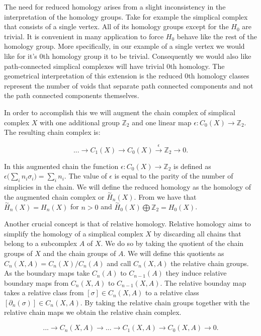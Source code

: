 The need for reduced homology arises from a slight inconsistency in the interpretation of the homology groups. Take for example the simplical complex that consists of a single vertex. All of its homology groups except for the $H_0$ are trivial. It is convenient in many application to force $H_0$ behave like the rest of the homology group. More specifically, in our example of a single vertex we would like for it's 0th homology group it to be trivial. Consequently we would also like path-connected simplical complexes will have trivial 0th homology. The geometrical interpretation of this extension is the reduced 0th homology classes represent the number of voids that separate path connected components and not the path connected components themselves.

In order to accomplish this we will augment the chain complex of simplical complex $X$ with one additional group $\mathbb{Z}_2$ and one linear map $\epsilon : C_0(X) \to \mathbb{Z}_2$. The resulting chain complex is:

$$ ... \longrightarrow C_1(X) \longrightarrow C_0(X) \overset{\epsilon}{\longrightarrow} \mathbb{Z}_2 \longrightarrow 0 .$$

In this augmented chain the function $\epsilon: C_0(X) \to \mathbb{Z}_2$ is defined as $\epsilon\big(\sum_{i}n_i\sigma_i\big) = \sum_{i}n_i$. The value of $\epsilon$ is equal to the parity of the number of simplicies in the chain. We will define the reduced homology as the homology of the augmented chain complex or $\overset{\sim}{H}_n(X)$. From \cite{algebraic-topology} we have that $\overset{\sim}{H}_n(X) = H_n(X)$ for $n > 0$ and $\overset{\sim}{H}_0(X) \bigoplus \mathbb{Z}_2 = H_0(X)$.

Another crucial concept is that of relative homology. Relative homology aims to simplify the homology of a simplical complex $X$ by discarding all chains that belong to a subcomplex $A$ of $X$. We do so by taking the quotient of the chain groups of $X$ and the chain groups of $A$. We will define this quotients as $C_n(X, A) = C_n(X) / C_n(A)$ and call $C_n(X, A)$ the relative chain groups. As the boundary maps take $C_n(A)$ to $C_{n-1}(A)$ they induce relative boundary maps from $C_n(X, A)$ to $C_{n-1}(X, A)$. The relative bounday map takes a relative class from $[\sigma] \in C_n(X, A)$ to a relative class $[\partial_n(\sigma)] \in C_n(X, A)$. By taking the relative chain groups together with the relative chain maps we obtain the relative chain complex.

$$ ... \longrightarrow C_n(X, A) \longrightarrow ... \longrightarrow C_1(X, A) \longrightarrow C_0(X, A) \longrightarrow 0. $$

